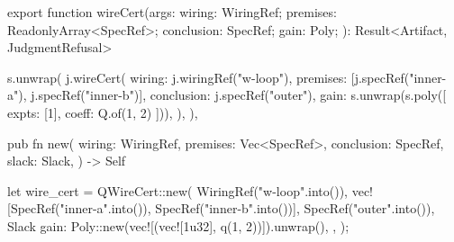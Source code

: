\begin{tssrc}
export function wireCert(args: {
  wiring: WiringRef;
  premises: ReadonlyArray<SpecRef>;
  conclusion: SpecRef;
  gain: Poly;
}): Result<Artifact, JudgmentRefusal>
\end{tssrc}
\begin{tssrc}
s.unwrap(
  j.wireCert({
    wiring: j.wiringRef("w-loop"),
    premises: [j.specRef("inner-a"), j.specRef("inner-b")],
    conclusion: j.specRef("outer"),
    gain: s.unwrap(s.poly([{ expts: [1], coeff: Q.of(1, 2) }])),
  }),
),
\end{tssrc}
\begin{rustsrc}
pub fn new(
    wiring: WiringRef,
    premises: Vec<SpecRef>,
    conclusion: SpecRef,
    slack: Slack,
) -> Self
\end{rustsrc}
\begin{rustsrc}
let wire_cert = QWireCert::new(
    WiringRef("w-loop".into()),
    vec![SpecRef("inner-a".into()), SpecRef("inner-b".into())],
    SpecRef("outer".into()),
    Slack {
        gain: Poly::new(vec![(vec![1u32], q(1, 2))]).unwrap(),
    },
);
\end{rustsrc}
